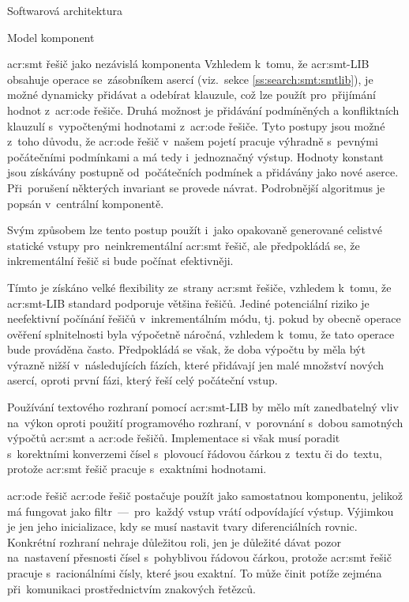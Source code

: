 \documentclass[thesis=M,czech]{FITthesis}[2012/06/26]
\newcommand{\acrlabel}[1]{acr:#1}
\newcommand{\acr}[1]{\acrshort{\acrlabel{#1}}}
\newcommand{\rf}[1]{\ref{#1}}
\begin{document}
\begin{section}{Softwarová architektura}
\begin{subsection}{Model komponent}
\begin{subsubsection}{\acr{smt} řešič jako nezávislá komponenta}
Vzhledem k~tomu, že \acr{smt}-LIB
obsahuje operace se~zásobníkem asercí
(viz.~sekce \rf{ss:search:smt:smtlib}),
je možné dynamicky přidávat a odebírat
klauzule, což lze použít
pro~přijímání hodnot z~\acr{ode} řešiče.
Druhá možnost je přidávání
podmíněných a konfliktních klauzulí
s~vypočtenými hodnotami z~\acr{ode} řešiče.
Tyto postupy jsou možné z~toho důvodu,
že \acr{ode} řešič v~našem pojetí
pracuje výhradně s~pevnými počátečními podmínkami
a má tedy i~jednoznačný výstup.
Hodnoty konstant jsou získávány postupně
od~počátečních podmínek a přidávány jako nové aserce.
Při~porušení některých invariant
se provede návrat.
Podrobnější algoritmus je popsán
v~centrální komponentě.

Svým způsobem lze tento postup použít
i~jako opakovaně generované celistvé statické vstupy
pro~neinkrementální \acr{smt} řešič,
ale předpokládá se, že inkrementální řešič
si bude počínat efektivněji.

Tímto je získáno velké flexibility
ze~strany \acr{smt} řešiče,
vzhledem k~tomu, že \acr{smt}-LIB standard
podporuje většina řešičů.
Jediné potenciální riziko
je neefektivní počínání řešičů
v~inkrementálním módu,
tj. pokud by obecně operace ověření splnitelnosti
byla výpočetně náročná,
vzhledem k~tomu, že tato operace bude prováděna často.
Předpokládá se však,
že doba výpočtu by měla být výrazně nižší
v~následujících fázích,
které přidávají jen malé množství nových asercí,
oproti první fázi,
který řeší celý počáteční vstup.

Používání textového rozhraní pomocí \acr{smt}-LIB
by mělo mít zanedbatelný vliv na~výkon
oproti použití programového rozhraní,
v~porovnání s~dobou samotných výpočtů
\acr{smt} a \acr{ode} řešičů.
Implementace si však musí poradit
s~korektními konverzemi čísel s~plovoucí řádovou čárkou
z~textu či do~textu,
protože \acr{smt} řešič pracuje s~exaktními hodnotami.
\end{subsubsection} %


\begin{subsubsection}{\acr{ode} řešič}\label{sss:design:arch:comp:ode}
\acr{ode} řešič postačuje použít jako samostatnou komponentu,
jelikož má fungovat jako
filtr~---~pro~každý vstup vrátí odpovídající výstup.
Výjimkou je jen jeho inicializace,
kdy se musí nastavit tvary diferenciálních rovnic.
Konkrétní rozhraní nehraje důležitou roli,
jen je důležité dávat pozor na~nastavení přesnosti
čísel s~pohyblivou řádovou čárkou,
protože \acr{smt} řešič pracuje s~racionálními čísly,
které jsou exaktní. To může činit potíže zejména
při~komunikaci prostřednictvím znakových řetězců.


\end{subsubsection}
\end{subsection}
\end{section}
\end{document}
